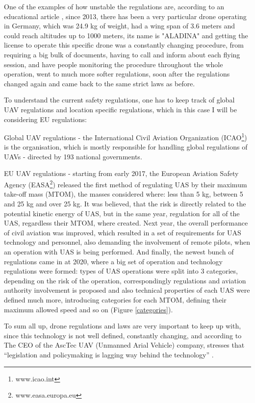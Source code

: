 \documentclass[11pt,a4paper,footinclude=true,headinclude=true, oneside]{scrbook}
\begin{document}
One of the examples of how unstable the regulations are, according to an educational article
\cite{alamouri_exploratory_2021}, since 2013, there has been a very particular drone operating in Germany, which was 24.9 kg of weight, had a wing span of 3.6 meters and could reach altitudes up to 1000 meters, its name is "ALADINA" and getting the license to operate this specific drone was a constantly changing procedure, from requiring a big bulk of documents, having to call and inform about each flying session, and have people monitoring the procedure throughout the whole operation, went to much more softer regulations, soon after the regulations changed again and came back to the same strict laws as before.

To understand the current safety regulations, one has to keep track of global UAV regulations and location specific regulations, which in this case I will be considering EU regulations:

Global UAV regulations - the International Civil Aviation Organization
(ICAO\footnote{www.icao.int}) is the organisation, which is mostly responsible for handling global regulations of UAVs - directed by 193 national governments.

EU UAV regulations \cite{alamouri_exploratory_2021} - starting from early 2017, the European Aviation Safety Agency (EASA\footnote{www.easa.europa.eu}) released the first method
of regulating UAS by their maximum take-off mass (MTOM), the masses considered where: less than 5 kg, between 5 and 25 kg and over 25 kg. It was believed, that the risk is directly related to the potential kinetic energy of UAS, but in the same year, regulation for all of the UAS, regardless their MTOM, where created. Next year, the overall performance of civil aviation was improved, which resulted in a set of requirements for UAS technology and personnel, also demanding the involvement of remote pilots, when an operation with UAS is being performed. And finally, the newest bunch of regulations came in at 2020, where a big set of operation and technology regulations were formed: types of UAS operations were split into 3 categories, depending on the risk of the operation, correspondingly regulations and aviation authority involvement is proposed and also technical properties of each UAS were defined much more, introducing categories for each MTOM, defining their maximum allowed speed and so on (Figure \ref{categories}).

To sum all up, drone regulations and laws are very important to keep up with, since this technology is not well defined, constantly changing, and according to The CEO of the AscTec UAV (Unmanned Arial Vehicle) company, stresses that “legislation and policymaking is lagging way behind the technology” \cite{stocker_review_2017}.
\end{document}
